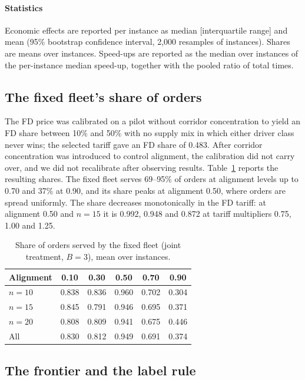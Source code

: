 \documentclass[review,12pt]{elsarticle}
\theoremstyle{definition}
\theoremstyle{remark}
\begin{document}
\paragraph{Statistics} Economic effects are reported per instance as median
[interquartile range] and mean (95\% bootstrap confidence interval, 2,000
resamples of instances). Shares are means over instances. Speed-ups are
reported as the median over instances of the per-instance median speed-up,
together with the pooled ratio of total times.

\subsection{The fixed fleet's share of orders}
\label{sec:fdshare}

The FD price was calibrated on a pilot without corridor concentration to
yield an FD share between 10\% and 50\% with no supply mix in which either
driver class never wins; the selected tariff gave an FD share of 0.483. After
corridor concentration was introduced to control alignment, the calibration
did not carry over, and we did not recalibrate after observing results.
Table~\ref{tab:fdshare} reports the resulting shares. The fixed fleet serves
69--95\% of orders at alignment levels up to 0.70 and 37\% at 0.90, and its
share peaks at alignment 0.50, where orders are spread uniformly. The share
decreases monotonically in the FD tariff: at alignment 0.50 and $n=15$ it
is 0.992, 0.948 and 0.872 at tariff multipliers 0.75, 1.00 and 1.25.

\begin{table}[t]
\centering
\caption{Share of orders served by the fixed fleet (joint treatment, $B=3$), mean over instances.}
\label{tab:fdshare}
\begin{tabular}{lccccc}
\toprule
Alignment & 0.10 & 0.30 & 0.50 & 0.70 & 0.90\\
\midrule
$n=10$ & 0.838 & 0.836 & 0.960 & 0.702 & 0.304\\
$n=15$ & 0.845 & 0.791 & 0.946 & 0.695 & 0.371\\
$n=20$ & 0.808 & 0.809 & 0.941 & 0.675 & 0.446\\
All    & 0.830 & 0.812 & 0.949 & 0.691 & 0.374\\
\bottomrule
\end{tabular}
\end{table}

\subsection{The frontier and the label rule}
\label{sec:exp-frontier}
\end{document}
